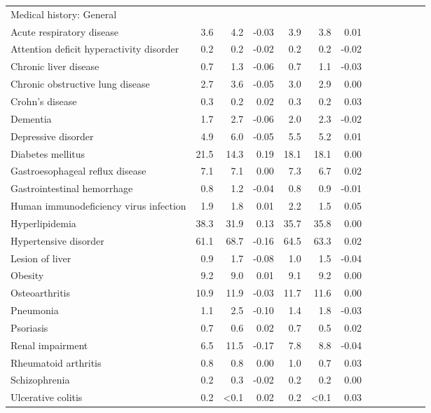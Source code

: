 \documentclass[11pt,]{article}
\begin{document}
\begin{longtable}{lrrrrrrrrrrrr}
  Medical history: General &    &    &     &    &    &     \\ 
      Acute respiratory disease &  3.6 &  4.2 & -0.03 &  3.9 &  3.8 &  0.01 \\ 
      Attention deficit hyperactivity disorder &  0.2 &  0.2 & -0.02 &  0.2 &  0.2 & -0.02 \\ 
      Chronic liver disease &  0.7 &  1.3 & -0.06 &  0.7 &  1.1 & -0.03 \\ 
      Chronic obstructive lung disease &  2.7 &  3.6 & -0.05 &  3.0 &  2.9 &  0.00 \\ 
      Crohn's disease &  0.3 &  0.2 &  0.02 &  0.3 &  0.2 &  0.03 \\ 
      Dementia &  1.7 &  2.7 & -0.06 &  2.0 &  2.3 & -0.02 \\ 
      Depressive disorder &  4.9 &  6.0 & -0.05 &  5.5 &  5.2 &  0.01 \\ 
      Diabetes mellitus & 21.5 & 14.3 &  0.19 & 18.1 & 18.1 &  0.00 \\ 
      Gastroesophageal reflux disease &  7.1 &  7.1 &  0.00 &  7.3 &  6.7 &  0.02 \\ 
      Gastrointestinal hemorrhage &  0.8 &  1.2 & -0.04 &  0.8 &  0.9 & -0.01 \\ 
      Human immunodeficiency virus infection &  1.9 &  1.8 &  0.01 &  2.2 &  1.5 &  0.05 \\ 
      Hyperlipidemia & 38.3 & 31.9 &  0.13 & 35.7 & 35.8 &  0.00 \\ 
      Hypertensive disorder & 61.1 & 68.7 & -0.16 & 64.5 & 63.3 &  0.02 \\ 
      Lesion of liver &  0.9 &  1.7 & -0.08 &  1.0 &  1.5 & -0.04 \\ 
      Obesity &  9.2 &  9.0 &  0.01 &  9.1 &  9.2 &  0.00 \\ 
      Osteoarthritis & 10.9 & 11.9 & -0.03 & 11.7 & 11.6 &  0.00 \\ 
      Pneumonia &  1.1 &  2.5 & -0.10 &  1.4 &  1.8 & -0.03 \\ 
      Psoriasis &  0.7 &  0.6 &  0.02 &  0.7 &  0.5 &  0.02 \\ 
      Renal impairment &  6.5 & 11.5 & -0.17 &  7.8 &  8.8 & -0.04 \\ 
      Rheumatoid arthritis &  0.8 &  0.8 &  0.00 &  1.0 &  0.7 &  0.03 \\ 
      Schizophrenia &  0.2 &  0.3 & -0.02 &  0.2 &  0.2 &  0.00 \\ 
      Ulcerative colitis &  0.2 & <0.1 &  0.02 &  0.2 & <0.1 &  0.03 \\ 

\end{longtable}
\end{document}
